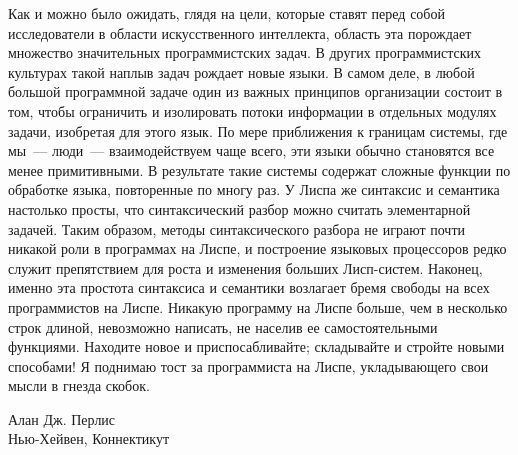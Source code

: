 	Как и можно было ожидать, глядя на цели, которые ставят перед
собой исследователи в области искусственного интеллекта, область эта
порождает множество значительных 
программистских задач.  В других программистских культурах такой
наплыв задач рождает новые языки.  В самом деле, в любой
большой программной задаче один из важных принципов организации	
состоит в том, чтобы  ограничить и изолировать потоки информации в отдельных
модулях задачи, изобретая для этого язык.  По мере приближения к
границам системы, где мы~--- люди~---
взаимодействуем чаще всего, эти языки обычно становятся все менее
примитивными.  В результате такие системы содержат сложные функции по
обработке языка, повторенные по многу раз.  У Лиспа же синтаксис и
семантика настолько просты, что синтаксический разбор можно считать 
элементарной задачей.  Таким образом, методы синтаксического
разбора не играют почти никакой роли в программах на Лиспе, и
построение языковых процессоров редко служит препятствием для роста и
изменения больших Лисп-систем.  Наконец, именно эта простота
синтаксиса и семантики возлагает бремя свободы на всех 
программистов на Лиспе.  Никакую программу на Лиспе больше, чем 
в несколько строк длиной, невозможно написать, не населив ее
самостоятельными функциями.  Находите новое и приспосабливайте; складывайте и
стройте новыми способами!  Я поднимаю
тост за программиста на Лиспе, укладывающего свои мысли в гнезда скобок.

\par\bigskip
{\parindent=0cm
Алан Дж. Перлис \\
Нью-Хейвен, Коннектикут}
